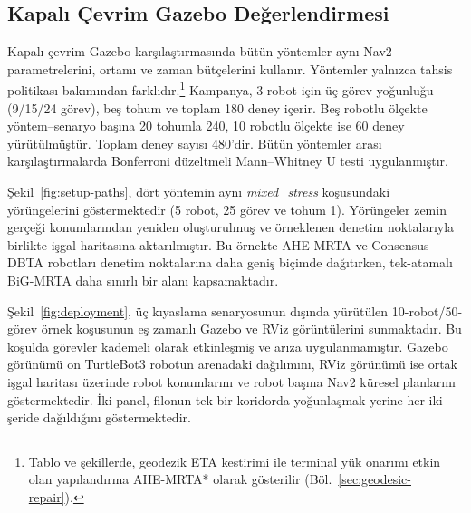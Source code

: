 \documentclass[10pt,letterpaper,onecolumn]{IEEEtran}
\begin{document}
\subsection{Kapalı Çevrim Gazebo Değerlendirmesi}
\label{sec:results-gazebo}

Kapalı çevrim Gazebo karşılaştırmasında bütün yöntemler aynı Nav2
parametrelerini, ortamı ve zaman bütçelerini kullanır. Yöntemler yalnızca
tahsis politikası bakımından farklıdır.\footnote{Tablo ve şekillerde,
geodezik ETA kestirimi ile terminal yük onarımı etkin olan yapılandırma
AHE-MRTA* olarak gösterilir (Böl.~\ref{sec:geodesic-repair}).} Kampanya, 3
robot için üç görev yoğunluğu (9/15/24 görev), beş tohum ve toplam 180 deney
içerir. Beş robotlu ölçekte yöntem--senaryo başına 20 tohumla 240, 10 robotlu
ölçekte ise 60 deney yürütülmüştür. Toplam deney sayısı 480'dir. Bütün
yöntemler arası karşılaştırmalarda Bonferroni düzeltmeli Mann--Whitney U testi
uygulanmıştır.

Şekil~\ref{fig:setup-paths}, dört yöntemin aynı \textit{mixed\_stress}
koşusundaki yörüngelerini göstermektedir (5 robot, 25 görev ve tohum 1).
Yörüngeler zemin gerçeği konumlarından yeniden oluşturulmuş ve örneklenen
denetim noktalarıyla birlikte işgal haritasına aktarılmıştır. Bu örnekte
AHE-MRTA ve Consensus-DBTA robotları denetim noktalarına daha geniş biçimde
dağıtırken, tek-atamalı BiG-MRTA daha sınırlı bir alanı kapsamaktadır.

Şekil~\ref{fig:deployment}, üç kıyaslama senaryosunun dışında yürütülen
10-robot/50-görev örnek koşusunun eş zamanlı Gazebo ve RViz görüntülerini
sunmaktadır. Bu koşulda görevler kademeli olarak etkinleşmiş ve arıza
uygulanmamıştır. Gazebo görünümü on TurtleBot3 robotun arenadaki dağılımını,
RViz görünümü ise ortak işgal haritası üzerinde robot konumlarını ve robot
başına Nav2 küresel planlarını göstermektedir. İki panel, filonun tek bir
koridorda yoğunlaşmak yerine her iki şeride dağıldığını göstermektedir.
\end{document}
